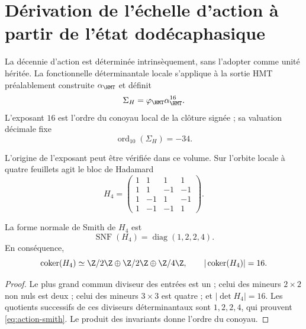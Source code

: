 \label{ch:vacuum}

\section{Dérivation de l'échelle d'action à partir de l'état dodécaphasique}

La décennie d'action est déterminée intrinsèquement, sans l'adopter comme
unité héritée. La fonctionnelle déterminantale locale s'applique à la sortie HMT
préalablement construite \(\alpha_{\HMT}\) et définit
\begin{equation}
\Sigma_H=\varphi_{\HMT}\alpha_{\HMT}^{16}.
\label{eq:action-determinantal-reader}
\end{equation}
L'exposant \(16\) est l'ordre du conoyau local de la clôture signée ; sa valuation décimale fixe
\begin{equation}
\operatorname{ord}_{10}(\Sigma_H)=-34.
\label{eq:action-decade}
\end{equation}

L'origine de l'exposant peut être vérifiée dans ce volume. Sur
l'orbite locale à quatre feuillets agit le bloc de Hadamard
\begin{equation}
H_4=
\begin{pmatrix}
1&1&1&1\\
1&1&-1&-1\\
1&-1&1&-1\\
1&-1&-1&1
\end{pmatrix}.
\label{eq:action-hadamard}
\end{equation}

\begin{lemma}
La forme normale de Smith de \(H_4\) est
\begin{equation}
\operatorname{SNF}(H_4)=\operatorname{diag}(1,2,2,4).
\label{eq:action-smith}
\end{equation}
En conséquence,
\[
\operatorname{coker}(H_4)\simeq
\Z/2\Z\oplus\Z/2\Z\oplus\Z/4\Z,
\qquad
|\operatorname{coker}(H_4)|=16.
\]
\end{lemma}

\begin{proof}
Le plus grand commun diviseur des entrées est un ; celui des mineurs
\(2\times2\) non nuls est deux ; celui des mineurs \(3\times3\) est quatre ; et
\(|\det H_4|=16\). Les quotients successifs de ces diviseurs déterminantaux
sont \(1,2,2,4\), qui prouvent \cref{eq:action-smith}. Le produit des
invariants donne l'ordre du conoyau.
\end{proof}

